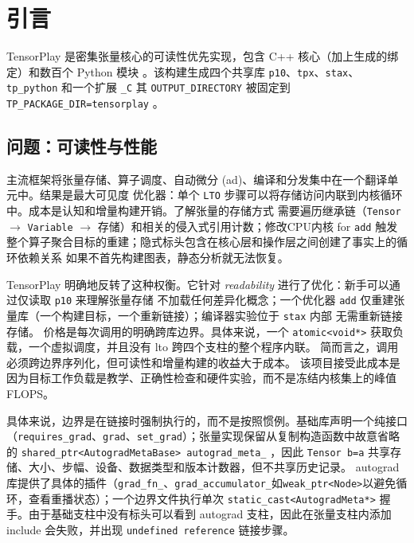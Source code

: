 \section{引言}
\label{sec:intro}

TensorPlay 是密集张量核心的可读性优先实现，包含 C++ 核心（加上生成的绑定）和数百个 Python 模块
。该构建生成四个共享库 \texttt{p10}、\texttt{tpx}、\texttt{stax}、\texttt{tp\_python} 和一个扩展 \texttt{\_C}
 其 \texttt{OUTPUT\_DIRECTORY} 被固定到 \texttt{TP\_PACKAGE\_DIR=tensorplay}
。

\subsection{问题：可读性与性能}
\label{sec:intro:problem}

主流框架将张量存储、算子调度、自动微分 (\ac{ad})、编译和分发集中在一个翻译单元中。结果是最大可见度
优化器：单个 \texttt{LTO} 步骤可以将存储访问内联到内核循环中。成本是认知和增量构建开销。了解张量的存储方式
需要遍历继承链（\texttt{Tensor} $\rightarrow$ \texttt{Variable} $\rightarrow$ 存储）和相关的侵入式引用计数；修改CPU内核
for \texttt{add} 触发整个算子聚合目标的重建；隐式标头包含在核心层和操作层之间创建了事实上的循环依赖关系
如果不首先构建图表，静态分析就无法恢复。

TensorPlay 明确地反转了这种权衡。它针对 \emph{readability} 进行了优化：新手可以通过仅读取 \texttt{p10} 来理解张量存储
 不加载任何差异化概念；一个优化器
\texttt{add} 仅重建张量库（一个构建目标，一个重新链接）；编译器实验位于 \texttt{stax} 内部
无需重新链接存储。
价格是每次调用的明确跨库边界。具体来说，一个 \texttt{atomic<void*>} 获取负载，一个虚拟调度，并且没有 \ac{lto} 跨四个支柱的整个程序内联。
简而言之，调用必须跨边界序列化，但可读性和增量构建的收益大于成本。
该项目接受此成本是因为目标工作负载是教学、正确性检查和硬件实验，而不是冻结内核集上的峰值 FLOPS。

具体来说，边界是在链接时强制执行的，而不是按照惯例。基础库声明一个纯接口（\texttt{requires\_grad}、\texttt{grad}、\texttt{set\_grad}）；张量实现保留从复制构造函数中故意省略的 \texttt{shared\_ptr<AutogradMetaBase> autograd\_meta\_} ，因此 \texttt{Tensor b=a} 共享存储、大小、步幅、设备、数据类型和版本计数器，但不共享历史记录。 autograd库提供了具体的插件（\texttt{grad\_fn\_}、\texttt{grad\_accumulator\_}如\texttt{weak\_ptr<Node>}以避免循环，查看重播状态）；一个边界文件执行单次 \texttt{static\_cast<AutogradMeta*>} 握手。由于基础支柱中没有标头可以看到 autograd 支柱，因此在张量支柱内添加 include 会失败，并出现 \texttt{undefined reference} 链接步骤。

